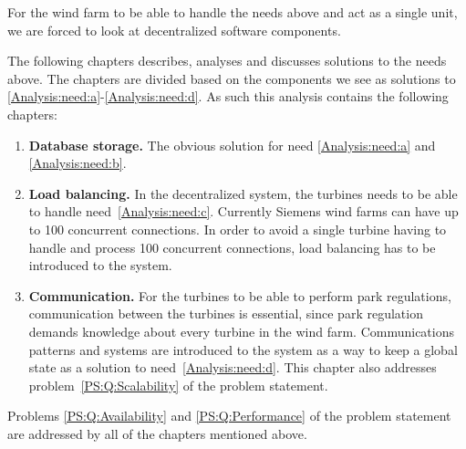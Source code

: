 For the wind farm to be able to handle the needs above and act as a single unit, we are forced to look at decentralized software components. 

The following chapters describes, analyses and discusses solutions to the needs above. The chapters are divided based on the components we see as solutions to \ref{Analysis:need:a}-\ref{Analysis:need:d}. As such this analysis contains the following chapters:

\begin{enumerate}[label=2.\arabic*]
\item{\textbf{Database storage.}} The obvious solution for need \ref{Analysis:need:a} and \ref{Analysis:need:b}.
\item{\textbf{Load balancing.}} In the decentralized system, the turbines needs to be able to handle need~\ref{Analysis:need:c}. Currently Siemens wind farms can have up to 100 concurrent connections. In order to avoid a single turbine having to handle and process 100 concurrent connections, load balancing has to be introduced to the system.
\item{\textbf{Communication.}} For the turbines to be able to perform park regulations, communication between the turbines is essential, since park regulation demands knowledge about every turbine in the wind farm. Communications patterns and systems are introduced to the system as a way to keep a global state as a solution to need~\ref{Analysis:need:d}. This chapter also addresses problem~\ref{PS:Q:Scalability} of the problem statement.
\end{enumerate}

Problems \ref{PS:Q:Availability} and \ref{PS:Q:Performance} of the problem statement are addressed by all of the chapters mentioned above.

%
%
%
%
%
%




